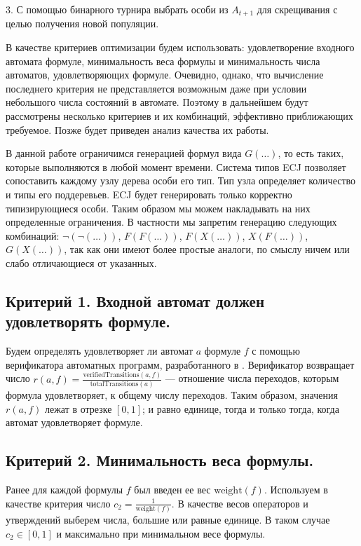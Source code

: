 \documentclass[12pt,fleqn]{article}
\begin{document}
3. С помощью бинарного турнира выбрать особи из $A_{t+1}$ для скрещивания с целью получения новой популяции. 

В качестве критериев оптимизации будем использовать: удовлетворение входного автомата формуле, минимальность веса
формулы и минимальность числа автоматов, удовлетворяющих формуле. Очевидно, однако, что вычисление последнего
критерия не представляется возможным даже при условии небольшого числа состояний в автомате. Поэтому в дальнейшем будут
рассмотрены несколько критериев и их комбинаций, эффективно приближающих требуемое. Позже будет приведен
анализ качества их работы.

В данной работе ограничимся генерацией формул вида $G(\ldots)$, то есть таких, которые выполняются в любой момент времени.
Система типов ECJ позволяет сопоставить каждому узлу дерева особи его тип. Тип узла
определяет количество и типы его поддеревьев. ECJ будет генерировать только корректно типизирующиеся особи.
Таким образом мы можем накладывать на них определенные ограничения. В частности мы запретим генерацию следующих
комбинаций: $\lnot(\lnot(\ldots))$, $F(F(\ldots))$, $F(X(\ldots))$, $X(F(\ldots))$, $G(X(\ldots))$, так как
они имеют более простые аналоги, по смыслу ничем или слабо отличающиеся от указанных.

\subsection{Критерий 1. Входной автомат должен удовлетворять формуле.}

Будем определять удовлетворяет ли автомат $a$ формуле $f$ с помощью верификатора автоматных программ, разработанного в \cite{eg}.
Верификатор возвращает число $r(a, f) = \frac{\text{verifiedTransitions}(a, f)}{\text{totalTransitions}(a)}$ --- отношение числа
переходов, которым формула удовлетворяет, к общему числу переходов. Таким образом, значения $r(a, f)$ лежат в отрезке $[0, 1]$; и равно
единице, тогда и только тогда, когда автомат удовлетворяет формуле.

\subsection{Критерий 2. Минимальность веса формулы.}

Ранее для каждой формулы $f$ был введен ее вес $\text{weight}(f)$. Используем в качестве критерия число $c_2 = \frac{1}{\text{weight}(f)}$.
В качестве весов операторов и утверждений выберем числа, большие или равные единице.
В таком случае $c_2 \in [0, 1]$ и максимально при минимальном весе формулы.
\end{document}
